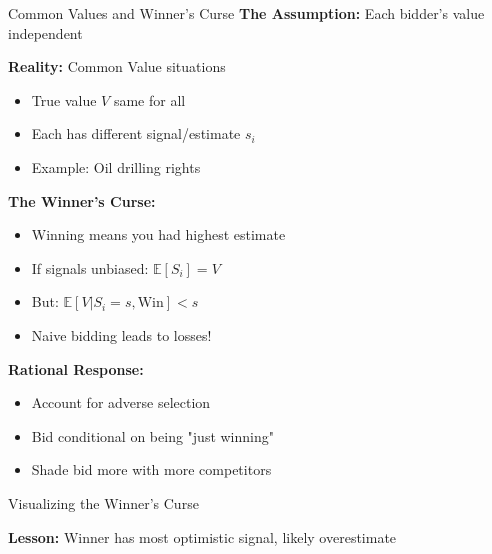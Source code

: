 \documentclass[xcolor={x11names}, aspectratio=169 ]{beamer}
\newcommand{\E}{\mathbb{E}}
\begin{document}
\begin{frame}{Common Values and Winner's Curse}
\textbf{The Assumption:} Each bidder's value independent

\textbf{Reality:} Common Value situations
\begin{itemize}
  \item True value $V$ same for all
  \item Each has different signal/estimate $s_i$
  \item Example: Oil drilling rights
\end{itemize}

\textbf{The Winner's Curse:}
\begin{itemize}
  \item Winning means you had highest estimate
  \item If signals unbiased: $\E[S_i] = V$
  \item But: $\E[V | S_i = s, \text{Win}] < s$
  \item Naive bidding leads to losses!
\end{itemize}

\textbf{Rational Response:}
\begin{itemize}
  \item Account for adverse selection
  \item Bid conditional on being "just winning"
  \item Shade bid more with more competitors
\end{itemize}
\end{frame}

\begin{frame}{Visualizing the Winner's Curse}
\begin{center}
\end{center}

\textbf{Lesson:} Winner has most optimistic signal, likely overestimate
\end{frame}
\end{document}
